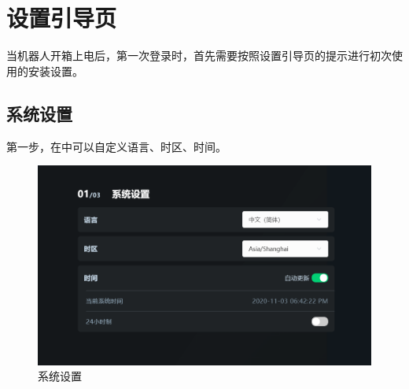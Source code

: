 
\section{设置引导页}

当机器人开箱上电后，第一次登录\LM 时，首先需要按照设置引导页的提示进行初次使用的安装设置。
\subsection{系统设置}
第一步，在中可以自定义语言、时区、时间。

\begin{figure}[ht]
    \centering
    \includegraphics[width=\textwidth]{screen/2-5.png}
    \caption{系统设置}
    \label{fig:系统设置}
\end{figure}

